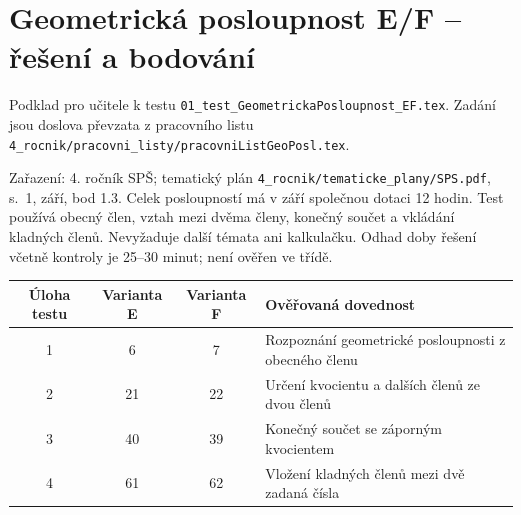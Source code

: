 \documentclass[a4paper,10pt]{article}
\begin{document}
\section*{Geometrická posloupnost E/F -- řešení a bodování}
Podklad pro učitele k testu
\texttt{01\_test\_GeometrickaPosloupnost\_EF.tex}.
Zadání jsou doslova převzata z pracovního listu
\texttt{4\_rocnik/pracovni\_listy/pracovniListGeoPosl.tex}.

Zařazení: 4. ročník SPŠ; tematický plán
\texttt{4\_rocnik/tematicke\_plany/SPS.pdf}, s.~1, září, bod 1.3.
Celek posloupností má v září společnou dotaci 12 hodin.
Test používá obecný člen, vztah mezi dvěma členy, konečný součet
a vkládání kladných členů. Nevyžaduje další témata ani kalkulačku.
Odhad doby řešení včetně kontroly je 25--30 minut; není ověřen ve třídě.

\begin{center}
\begin{tabular}{c|c|c|l}
Úloha testu & Varianta E & Varianta F & Ověřovaná dovednost\\ \hline
1 & 6 & 7 & Rozpoznání geometrické posloupnosti z obecného členu\\
2 & 21 & 22 & Určení kvocientu a dalších členů ze dvou členů\\
3 & 40 & 39 & Konečný součet se záporným kvocientem\\
4 & 61 & 62 & Vložení kladných členů mezi dvě zadaná čísla
\end{tabular}
\end{center}
\end{document}
